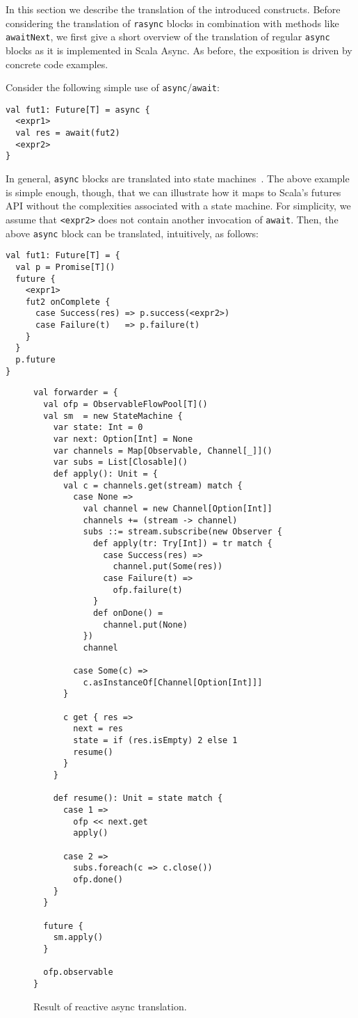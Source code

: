 \documentclass{acm_proc_article-sp}
\begin{document}
In this section we describe the translation of the introduced constructs.
Before considering the translation of \verb|rasync| blocks in combination with
methods like \verb|awaitNext|, we first give a short overview of the
translation of regular \verb|async| blocks as it is implemented in Scala
Async. As before, the exposition is driven by concrete code examples.

Consider the following simple use of \verb|async|/\verb|await|:

\begin{lstlisting}
val fut1: Future[T] = async {
  <expr1>
  val res = await(fut2)
  <expr2>
}
\end{lstlisting}

In general, \verb|async| blocks are translated into state
machines~\cite{ScalaAsyncSIP}. The above example is simple enough, though,
that we can illustrate how it maps to Scala's futures API without the
complexities associated with a state machine. For simplicity, we assume that
\verb|<expr2>| does not contain another invocation of \verb|await|. Then, the
above \verb|async| block can be translated, intuitively, as follows:

\begin{lstlisting}
val fut1: Future[T] = {
  val p = Promise[T]()
  future {
    <expr1>
    fut2 onComplete {
      case Success(res) => p.success(<expr2>)
      case Failure(t)   => p.failure(t)
    }
  }
  p.future
}
\end{lstlisting}

\begin{figure}[ht!]
  \centering
\lstset{numbers=left,xleftmargin=2em}
\begin{lstlisting}
val forwarder = {
  val ofp = ObservableFlowPool[T]()
  val sm  = new StateMachine {
    var state: Int = 0
    var next: Option[Int] = None
    var channels = Map[Observable, Channel[_]]()
    var subs = List[Closable]()
    def apply(): Unit = {
      val c = channels.get(stream) match {
        case None =>
          val channel = new Channel[Option[Int]]
          channels += (stream -> channel)
          subs ::= stream.subscribe(new Observer {
            def apply(tr: Try[Int]) = tr match {
              case Success(res) =>
                channel.put(Some(res))
              case Failure(t) =>
                ofp.failure(t)
            }
            def onDone() =
              channel.put(None)
          })
          channel

        case Some(c) =>
          c.asInstanceOf[Channel[Option[Int]]]
      }

      c get { res =>
        next = res
        state = if (res.isEmpty) 2 else 1
        resume()
      }
    }

    def resume(): Unit = state match {
      case 1 =>
        ofp << next.get
        apply()

      case 2 =>
        subs.foreach(c => c.close())
        ofp.done()
    }
  }

  future {
    sm.apply()
  }

  ofp.observable
}
\end{lstlisting}
  \caption{Result of reactive async translation.}
  \label{fig:rasync-translation}
\end{figure}
\end{document}
